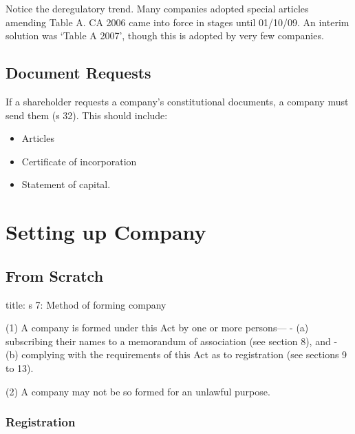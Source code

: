 \documentclass[
]{article}
\newenvironment{Shaded}{}{}
\newcommand{\NormalTok}[1]{#1}
\providecommand{\tightlist}{%
  \setlength{\itemsep}{0pt}\setlength{\parskip}{0pt}}
\begin{document}
Notice the deregulatory trend. Many companies adopted special articles
amending Table A. CA 2006 came into force in stages until 01/10/09. An
interim solution was `Table A 2007', though this is adopted by very few
companies.

\hypertarget{document-requests}{%
\subsection{Document Requests}\label{document-requests}}

If a shareholder requests a company's constitutional documents, a
company must send them (s 32). This should include:

\begin{itemize}
\tightlist
\item
  Articles
\item
  Certificate of incorporation
\item
  Statement of capital.
\end{itemize}

\hypertarget{setting-up-company}{%
\section{Setting up Company}\label{setting-up-company}}

\hypertarget{from-scratch}{%
\subsection{From Scratch}\label{from-scratch}}

\begin{Shaded}
\begin{Highlighting}[]
\NormalTok{title: s 7: Method of forming company}

\NormalTok{(1) A company is formed under this Act by one or more persons—}
\NormalTok{{-} (a) subscribing their names to a memorandum of association (see section 8), and}
\NormalTok{{-} (b) complying with the requirements of this Act as to registration (see sections 9 to 13).}

\NormalTok{(2) A company may not be so formed for an unlawful purpose.}
\end{Highlighting}
\end{Shaded}

\hypertarget{registration}{%
\subsubsection{Registration}\label{registration}}
\end{document}
